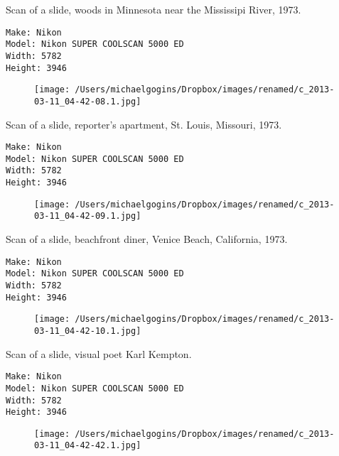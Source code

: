 \documentclass[11pt,letter,DIV=14,paper=landscape]{scrbook}
\begin{document}
\clearpage
\noindent Scan of a slide, woods in Minnesota near the Mississipi River, 1973.
\noindent
\begin{lstlisting}
Make: Nikon
Model: Nikon SUPER COOLSCAN 5000 ED
Width: 5782
Height: 3946
\end{lstlisting}
\clearpage

\begin{figure}
\texttt{[image: /Users/michaelgogins/Dropbox/images/renamed/c\_2013-03-11\_04-42-08.1.jpg]}
\end{figure}
    
\clearpage
\noindent Scan of a slide, reporter's apartment, St. Louis, Missouri, 1973.
\noindent
\begin{lstlisting}
Make: Nikon
Model: Nikon SUPER COOLSCAN 5000 ED
Width: 5782
Height: 3946
\end{lstlisting}
\clearpage

\begin{figure}
\texttt{[image: /Users/michaelgogins/Dropbox/images/renamed/c\_2013-03-11\_04-42-09.1.jpg]}
\end{figure}
    
\clearpage
\noindent Scan of a slide, beachfront diner, Venice Beach, California, 1973.
\noindent
\begin{lstlisting}
Make: Nikon
Model: Nikon SUPER COOLSCAN 5000 ED
Width: 5782
Height: 3946
\end{lstlisting}
\clearpage

\begin{figure}
\texttt{[image: /Users/michaelgogins/Dropbox/images/renamed/c\_2013-03-11\_04-42-10.1.jpg]}
\end{figure}
    
\clearpage
\noindent Scan of a slide, visual poet Karl Kempton.
\noindent
\begin{lstlisting}
Make: Nikon
Model: Nikon SUPER COOLSCAN 5000 ED
Width: 5782
Height: 3946
\end{lstlisting}
\clearpage

\begin{figure}
\texttt{[image: /Users/michaelgogins/Dropbox/images/renamed/c\_2013-03-11\_04-42-42.1.jpg]}
\end{figure}
    
\end{document}
